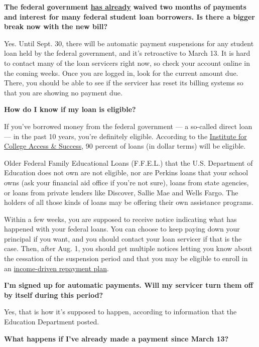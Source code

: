 \textbf{The federal government}
\textbf{\href{https://www.nytimes.com/article/coronavirus-money-unemployment.html\#link-3c2b8d5f}{has
already}} \textbf{waived two months of payments and interest for many
federal student loan borrowers. Is there a bigger break now with the new
bill?}

Yes. Until Sept. 30, there will be automatic payment suspensions for any
student loan held by the federal government, and it's retroactive to
March 13. It is hard to contact many of the loan servicers right now, so
check your account online in the coming weeks. Once you are logged in,
look for the current amount due. There, you should be able to see if the
servicer has reset its billing systems so that you are showing no
payment due.

\textbf{How do I know if my loan is eligible?}

If you've borrowed money from the federal government --- a so-called
direct loan --- in the past 10 years, you're definitely eligible.
According to the
\href{https://ticas.org/our-work/student-debt/}{Institute for College
Access \& Success}, 90 percent of loans (in dollar terms) will be
eligible.

Older Federal Family Educational Loans (F.F.E.L.) that the U.S.
Department of Education does not own are not eligible, nor are Perkins
loans that your school owns (ask your financial aid office if you're not
sure), loans from state agencies, or loans from private lenders like
Discover, Sallie Mae and Wells Fargo. The holders of all those kinds of
loans may be offering their own assistance programs.

Within a few weeks, you are supposed to receive notice indicating what
has happened with your federal loans. You can choose to keep paying down
your principal if you want, and you should contact your loan servicer if
that is the case. Then, after Aug. 1, you should get multiple notices
letting you know about the cessation of the suspension period and that
you may be eligible to enroll in an
\href{https://studentaid.gov/manage-loans/repayment/plans/income-driven}{income-driven
repayment plan}.

\textbf{I'm signed up for automatic payments. Will my servicer turn them
off by itself during this period?}

Yes, that is how it's supposed to happen, according to information that
the Education Department posted.

\textbf{What happens if I've already made a payment since March 13?}

